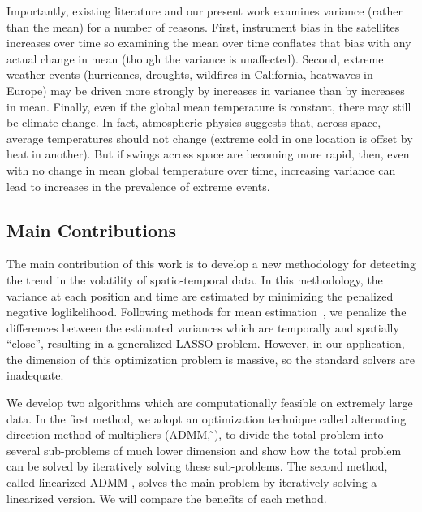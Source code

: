 \documentclass[letterpaper]{article} %
\newcommand{\citealp}[1]
{\citeauthor{#1} ̃\citeyear{#1}}
\begin{document}
Importantly, existing literature and our present work examines variance (rather
than the mean) for a number of reasons. 
First, instrument bias in the satellites increases over time so
examining the mean over time conflates that bias with any actual
change in mean (though the variance is unaffected). 
Second, extreme weather events (hurricanes, droughts, wildfires in
California, heatwaves in Europe) may be driven more strongly by increases
in variance than by increases in mean. 
Finally, even if the global mean temperature is constant, there may still
be climate change. In fact, atmospheric physics suggests that,
across space, average temperatures should not change (extreme cold
in one location is offset by heat in another). But if swings across
space are becoming more rapid, then, even with no change in mean global
temperature over time, increasing variance can lead to
increases in the prevalence of extreme events. 






\subsection{Main Contributions}

The main contribution of this work is to develop a new methodology for
detecting the trend in the volatility of spatio-temporal data. In this
methodology, the variance at each position and time are estimated by
minimizing the penalized negative
loglikelihood. Following methods for mean estimation~\cite{Tibshirani2014}, we penalize the  
differences between the estimated variances which
are temporally and spatially ``close'', resulting
in a generalized LASSO problem. However, in our application, the
dimension of this optimization problem is massive, so the
standard solvers are inadequate. 

We develop two algorithms
which are computationally feasible on extremely large data. In the
first method, we adopt an optimization technique 
called alternating direction method of multipliers
(ADMM, \citealp{boyd_distributed_2011}), to divide the total problem into
several sub-problems of much lower dimension and show how the total
problem can be solved by iteratively solving these sub-problems. The
second method, called linearized ADMM
\cite{parikh_proximal_2014}, solves the main problem by iteratively
solving a linearized version. We will compare the benefits of
each method. 
\end{document}
